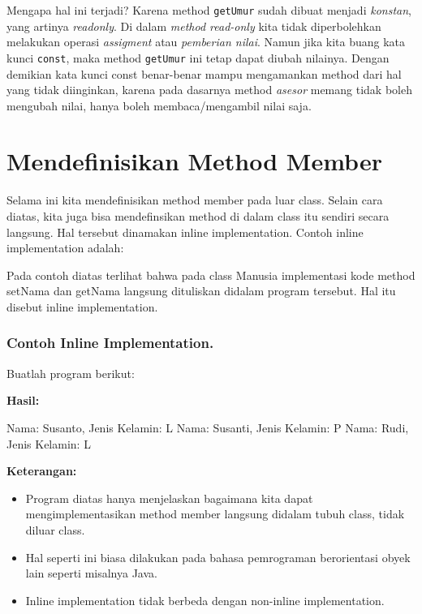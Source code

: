 Mengapa hal ini terjadi? Karena method \texttt{getUmur} sudah dibuat
menjadi \emph{konstan}, yang artinya \emph{readonly}. Di dalam
\emph{method read-only} kita tidak diperbolehkan melakukan operasi
\emph{assigment} atau \emph{pemberian nilai}. Namun jika kita buang kata
kunci \texttt{const}, maka method \texttt{getUmur} ini tetap dapat
diubah nilainya. Dengan demikian kata kunci const benar-benar mampu
mengamankan method dari hal yang tidak diinginkan, karena pada dasarnya
method \emph{asesor} memang tidak boleh mengubah nilai, hanya boleh
membaca/mengambil nilai saja.

\section{Mendefinisikan Method
Member}\label{mendefinisikan-method-member}

Selama ini kita mendefinisikan method member pada luar class. Selain
cara diatas, kita juga bisa mendefinsikan method di dalam class itu
sendiri secara langsung. Hal tersebut dinamakan inline implementation.
Contoh inline implementation adalah:



Pada contoh diatas terlihat bahwa pada class Manusia implementasi kode
method setNama dan getNama langsung dituliskan didalam program tersebut.
Hal itu disebut inline implementation.

\subsubsection*{Contoh Inline Implementation.}

Buatlah program berikut:



\textbf{Hasil:}
\begin{lcverbatim}
Nama: Susanto, Jenis Kelamin: L
Nama: Susanti, Jenis Kelamin: P
Nama: Rudi, Jenis Kelamin: L
\end{lcverbatim}


\textbf{Keterangan:}

\begin{itemize}

\item
 Program diatas hanya menjelaskan bagaimana kita dapat
 mengimplementasikan method member langsung didalam tubuh class, tidak
 diluar class.
\item
 Hal seperti ini biasa dilakukan pada bahasa pemrograman berorientasi
 obyek lain seperti misalnya Java.
\item
 Inline implementation tidak berbeda dengan non-inline implementation.
\end{itemize}

